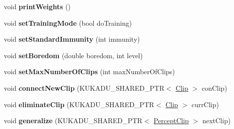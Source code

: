 \begin{DoxyCompactItemize}
\item 
void {\bfseries print\+Weights} ()\hypertarget{classkukadu_1_1ProjectiveSimulator_aefa86b1c8c1ec4af765fe4326de58d8e}{}\label{classkukadu_1_1ProjectiveSimulator_aefa86b1c8c1ec4af765fe4326de58d8e}

\item 
void {\bfseries set\+Training\+Mode} (bool do\+Training)\hypertarget{classkukadu_1_1ProjectiveSimulator_aae63392865e563583bdbe0f4d13f1e15}{}\label{classkukadu_1_1ProjectiveSimulator_aae63392865e563583bdbe0f4d13f1e15}

\item 
void {\bfseries set\+Standard\+Immunity} (int immunity)\hypertarget{classkukadu_1_1ProjectiveSimulator_a70b1a60ab925ae6e3ea9863f9441316d}{}\label{classkukadu_1_1ProjectiveSimulator_a70b1a60ab925ae6e3ea9863f9441316d}

\item 
void {\bfseries set\+Boredom} (double boredom, int level)\hypertarget{classkukadu_1_1ProjectiveSimulator_a4229e8a82d34e153890a5667eb504a18}{}\label{classkukadu_1_1ProjectiveSimulator_a4229e8a82d34e153890a5667eb504a18}

\item 
void {\bfseries set\+Max\+Number\+Of\+Clips} (int max\+Number\+Of\+Clips)\hypertarget{classkukadu_1_1ProjectiveSimulator_a6ef831cdb028505f18d3ae4f240c87da}{}\label{classkukadu_1_1ProjectiveSimulator_a6ef831cdb028505f18d3ae4f240c87da}

\item 
void {\bfseries connect\+New\+Clip} (K\+U\+K\+A\+D\+U\+\_\+\+S\+H\+A\+R\+E\+D\+\_\+\+P\+TR$<$ \hyperlink{classkukadu_1_1Clip}{Clip} $>$ con\+Clip)\hypertarget{classkukadu_1_1ProjectiveSimulator_a46b3dadc103c9c4a08ad6ceca15b57b6}{}\label{classkukadu_1_1ProjectiveSimulator_a46b3dadc103c9c4a08ad6ceca15b57b6}

\item 
void {\bfseries eliminate\+Clip} (K\+U\+K\+A\+D\+U\+\_\+\+S\+H\+A\+R\+E\+D\+\_\+\+P\+TR$<$ \hyperlink{classkukadu_1_1Clip}{Clip} $>$ curr\+Clip)\hypertarget{classkukadu_1_1ProjectiveSimulator_a86a95c6087dd30be659efbf46408551f}{}\label{classkukadu_1_1ProjectiveSimulator_a86a95c6087dd30be659efbf46408551f}

\item 
void {\bfseries generalize} (K\+U\+K\+A\+D\+U\+\_\+\+S\+H\+A\+R\+E\+D\+\_\+\+P\+TR$<$ \hyperlink{classkukadu_1_1PerceptClip}{Percept\+Clip} $>$ next\+Clip)\hypertarget{classkukadu_1_1ProjectiveSimulator_af63fed758aeac7a58d99c077ff1e3b61}{}\label{classkukadu_1_1ProjectiveSimulator_af63fed758aeac7a58d99c077ff1e3b61}


\end{DoxyCompactItemize}
